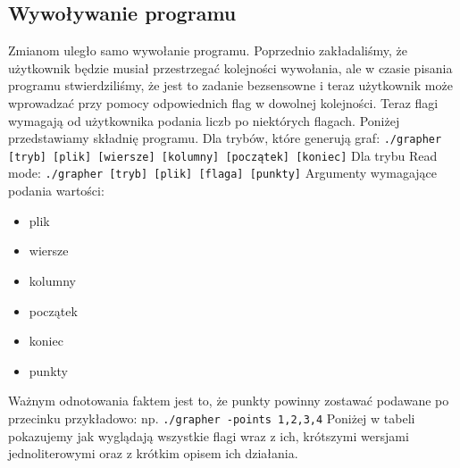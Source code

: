 \documentclass[10pt, a4paper]{report}
\begin{document}
    \subsection{Wywoływanie programu}
    Zmianom uległo samo wywołanie programu. Poprzednio zakładaliśmy, że użytkownik będzie musiał przestrzegać kolejności wywołania, ale w czasie
    pisania programu stwierdziliśmy, że jest to zadanie bezsensowne i teraz użytkownik może wprowadzać przy pomocy odpowiednich flag w dowolnej kolejności.
    Teraz flagi wymagają od użytkownika podania liczb po niektórych flagach. Poniżej przedstawiamy składnię programu.
    \newline Dla trybów, które generują graf:
    \newline\newline \texttt{./grapher [tryb] [plik] [wiersze] [kolumny] [początek] [koniec]}
    \newline\newline Dla trybu Read mode:
    \newline\newline \texttt{./grapher [tryb] [plik] [flaga] [punkty]}
    \newline\newline Argumenty wymagające podania wartości:
    \begin{itemize}
        \item plik
        \item wiersze
        \item kolumny
        \item początek
        \item koniec
        \item punkty
    \end{itemize}
    Ważnym odnotowania faktem jest to, że punkty powinny zostawać podawane po przecinku przykładowo:
    \newline\newline np.
    \newline \texttt{./grapher -points 1,2,3,4}
    \newline\newline Poniżej w tabeli pokazujemy jak wyglądają wszystkie flagi wraz z ich, krótszymi wersjami jednoliterowymi oraz z krótkim opisem ich działania.
    \newline
\end{document}
